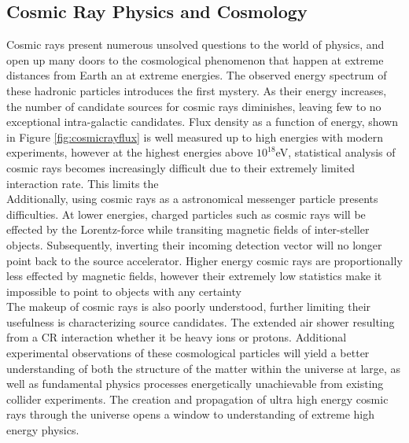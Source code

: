 	\subsection{Cosmic Ray Physics and Cosmology}
	Cosmic rays present numerous unsolved questions to the world of physics, and open up many doors to the cosmological phenomenon that happen at extreme distances from Earth an at extreme energies.  The observed energy spectrum of these hadronic particles introduces the first mystery.   As their energy increases, the number of candidate sources for cosmic rays diminishes, leaving few to no exceptional intra-galactic candidates.\cite{RevModPhys.71.S33}  Flux density as a function of energy, shown in Figure \ref{fig:cosmicrayflux} is well measured up to high energies with modern experiments, however at the highest energies above $10^{18}$eV, statistical analysis of cosmic rays becomes increasingly difficult due to their extremely limited interaction rate.  This limits the \\
	
	Additionally, using cosmic rays as a astronomical messenger particle presents difficulties.  At lower energies, charged particles such as cosmic rays will be effected by the Lorentz-force while transiting magnetic fields of inter-steller objects. Subsequently, inverting their incoming detection vector will no longer point back to the source accelerator.  Higher energy cosmic rays are proportionally less effected by magnetic fields, however their extremely low statistics make it impossible to point to objects with any certainty\\
	
	The makeup of cosmic rays is also poorly understood, further limiting their usefulness is characterizing source candidates.  The extended air shower resulting from a CR interaction whether it be heavy ions or protons.  Additional experimental observations of these cosmological particles will yield a better understanding of both the structure of the matter within the universe at large, as well as fundamental physics processes energetically unachievable from existing collider experiments.  The creation and propagation of ultra high energy cosmic rays through the universe opens a window to understanding of extreme high energy physics.

